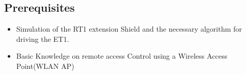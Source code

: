 



\subsection*{\Large Prerequisites}
    \begin{itemize}
        \item Simulation of the RT1 extension Shield and the necessary algorithm for driving the ET1.\\ 
        \item  Basic Knowledge on remote access Control using a Wireless Access Point(WLAN AP) \\
    \end{itemize}

